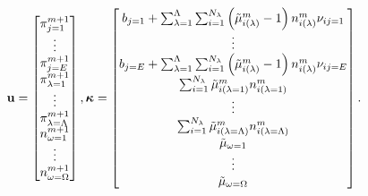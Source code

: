 \begin{equation}
  \mathbf{u} = \begin{bmatrix}
                \pi_{j=1}^{m+1} \\ \vdots \\ \pi_{j=E}^{m+1} \\ \pi_{\lambda=1}^{m+1} \\ \vdots \\ \pi_{\lambda=\Lambda}^{m+1} \\  n_{\omega=1}^{m+1} \\ \vdots \\ n_{\omega=\Omega}^{m+1}
            \end{bmatrix},
  \boldsymbol{\kappa} = \begin{bmatrix}
                  b_{j=1} + \sum_{\lambda=1}^{\Lambda} \sum_{i = 1}^{N_{\lambda}} \left(\tilde{\mu}_{i(\lambda)}^m -1 \right)n_{i(\lambda)}^m\nu_{ij=1} \\
                  \vdots \\
                  b_{j=E} + \sum_{\lambda=1}^{\Lambda} \sum_{i = 1}^{N_{\lambda}} \left(\tilde{\mu}_{i(\lambda)}^m -1 \right)n_{i(\lambda)}^m\nu_{ij=E} \\
                  \sum_{i = 1}^{N_{\lambda}} \tilde{\mu}_{i(\lambda = 1)}^m n_{i(\lambda = 1)}^m \\
                  \vdots \\
                  \sum_{i = 1}^{N_{\lambda}} \tilde{\mu}_{i(\lambda = \Lambda)}^m n_{i(\lambda = \Lambda)}^m \\
                  \tilde{\mu}_{\omega = 1} \\
                  \vdots \\
                  \tilde{\mu}_{\omega = \Omega}
                \end{bmatrix}.
\end{equation}

